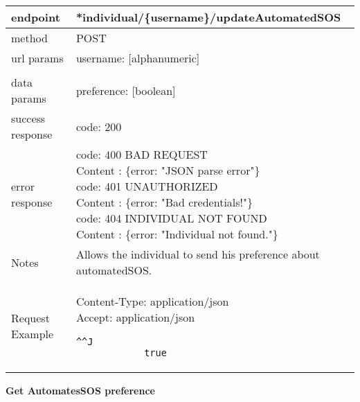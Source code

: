 	\begin{tabularx}{\linewidth}{| l| l }
		\hline
		endpoint & *individual/\{username\}/updateAutomatedSOS \\
		\hline
		method & POST \\
		\hline
		url params & 
		\parbox{0.7\textwidth}{
			\bigskip
			username: [alphanumeric]
			\bigskip
		}\\\\
		\hline
		data params &
		\parbox{0.7\textwidth}{
			\bigskip
			preference: [boolean]
			\bigskip
		} \\
		\hline
		success response &
		\parbox{0.7\textwidth}{
			\bigskip
			code: 200
			\bigskip
		} \\
		\hline
		error response &
		\parbox{0.7\textwidth}{
			\bigskip
			code: 400 BAD REQUEST \\
			Content : \{error: "JSON parse error"\}\\
			code: 401 UNAUTHORIZED \\
			Content : \{error: "Bad credentials!"\}\\
			code: 404 INDIVIDUAL NOT FOUND \\
			Content : \{error: "Individual not found."\}
			\bigskip
		} \\
		\hline
		Notes & 
		\parbox{0.7\textwidth}{
			\bigskip Allows the individual to send his preference about automatedSOS.
		\bigskip}  \\
		\hline
		Request Example & 
		\parbox{0.8\textwidth}{
		Content-Type: application/json \\
		Accept: application/json \\
		\begin{lstlisting}^^J
			true
	\end{lstlisting}
	} \\
	\hline
	\end{tabularx}
	
	\textbf{Get AutomatesSOS preference} \\

